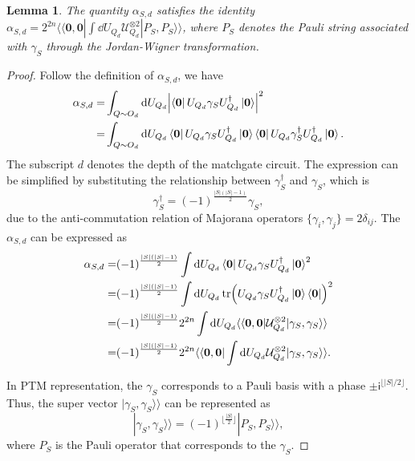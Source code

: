 \documentclass[showpacs,onecolumn,aps,prx,long bibliography,superscriptaddress,notitlepage]{revtex4-1}
\newtheorem{lemma}{Lemma}
\newcommand{\ii}{\mathsf{i}}
\newcommand{\supket}[1]{|#1 \rangle\rangle}
\newcommand{\supbra}[1]{\langle\langle #1 |}
\newcommand{\floor}[1]{\lfloor #1 \rfloor}
\begin{document}
\begin{lemma}
\label{lemma: The net phase of alpha is 1}
The quantity $\alpha_{S,d}$ satisfies the identity $\alpha_{S,d} = 2^{2n} \supbra{\bm{0}, \bm{0}} \int \dd U_{Q_d} \mathcal{U}_{Q_d}^{\otimes 2} \supket{P_S, P_S}$, where $P_S$ denotes the Pauli string associated with $\gamma_S$ through the Jordan-Wigner transformation.
\end{lemma}
\begin{proof}

Follow the definition of $\alpha_{S,d}$, we have
\begin{align}
    \alpha_{S,d} =& \int_{Q\sim O_d } \dd U_{Q_d} \abs{\bra{\bm 0} U_{Q_d} \gamma_S U_{Q_d}^\dagger \ket{\bm 0}}^2 \\
    =& \int_{Q\sim O_d } \dd U_{Q_d} \bra{\bm 0} U_{Q_d} \gamma_S U_{Q_d}^\dagger \ket{\bm 0}\bra{\bm 0} U_{Q_d} \gamma_S^\dagger U_{Q_d}^\dagger \ket{\bm 0}.
\end{align}
The subscript $d$ denotes the depth of the matchgate circuit. 
The expression can be simplified by substituting the relationship between $\gamma_S^\dagger$ and $\gamma_S$, which is 
\begin{equation}
    \gamma_S^\dagger = (-1)^{\frac{|S|(|S|-1)}{2}}\gamma_S,
\end{equation}
due to the anti-commutation relation of Majorana operators $\{\gamma_i, \gamma_j\} = 2\delta_{ij}$. 
The $\alpha_{S, d}$ can be expressed as  
\begin{align}
    \alpha_{S,d} =& (-1)^{\frac{|S|(|S|-1)}{2}}\int \dd U_{Q_d} 
    \bra{\bm 0}U_{Q_d} \gamma_SU_{Q_d}^\dagger\ket{\bm 0}^2\\
    =& (-1)^{\frac{|S|(|S|-1)}{2}} \int \dd U_{Q_d} 
    \tr(U_{Q_d} \gamma_SU_{Q_d}^\dagger\ket{\bm 0} \bra{\bm 0} )^2\\
    =& (-1)^{\frac{|S|(|S|-1)}{2}} 2^{2n} \int \dd U_{Q_d} 
    \supbra{\bm 0,\bm 0} \mathcal{U}_{Q_d}^{\otimes 2} \supket{\gamma_S,\gamma_S} \\
    =& (-1)^{\frac{|S|(|S|-1)}{2}} 2^{2n}  \supbra{\bm 0,\bm 0}  \int\dd U_{Q_d} \mathcal{U}_{Q_d}^{\otimes 2} \supket{\gamma_S,\gamma_S}.
    \label{appendix eq: alpha to net}
\end{align}

In PTM representation, the $\gamma_S$ corresponds to a Pauli basis with a phase $\pm \ii^{\floor{|S|/2}}$. Thus, the super vector $\supket{\gamma_S, \gamma_S}$ can be represented as 
\begin{equation}
    \supket{\gamma_S, \gamma_S} = (-1)^{\floor{\frac{|S|}{2}}} \supket{P_S, P_S},
    \label{appendix eq: gamma to P}
\end{equation}
 where $P_S$ is the Pauli operator that corresponds to the $\gamma_S$.


\end{proof}
\end{document}
